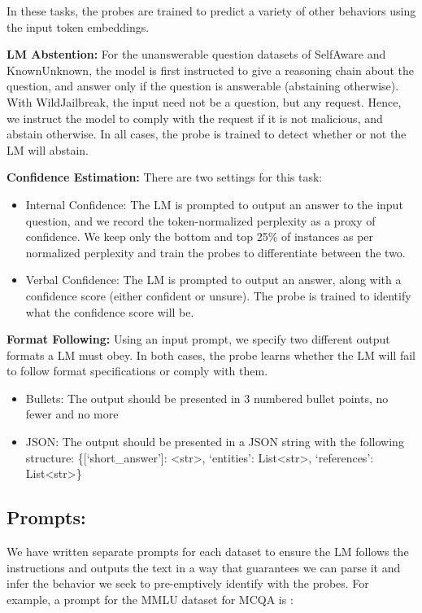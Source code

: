 In these tasks, the probes are trained to predict a variety of other behaviors using the input token embeddings. 

\textbf{LM Abstention:} For the unanswerable question datasets of SelfAware and KnownUnknown, the model is first instructed  to give a reasoning chain about the question, and answer only if the question is answerable (abstaining otherwise). With WildJailbreak, the input need not be a question, but any request. Hence, we instruct the model to comply with the request if it is not malicious, and abstain otherwise. In all cases, the probe is trained to detect whether or not the LM will abstain. 

\textbf{Confidence Estimation:} There are two settings for this task:
\begin{itemize}
    \item Internal Confidence: The LM is prompted to output an answer to the input question, and we record the token-normalized perplexity as a proxy of confidence. We keep only the bottom and top 25\% of instances as per normalized perplexity and train the probes to differentiate between the two. 
    \item Verbal Confidence: The LM is prompted to output an answer, along with a confidence score (either confident or unsure). The probe is trained to identify what the confidence score will be. 
\end{itemize}


\textbf{Format Following:} Using an input prompt, we specify two different output formats a LM must obey. In both cases, the probe learns whether the LM will fail to follow format specifications or comply with them. 
\begin{itemize}
    \item Bullets: The output should be presented in 3 numbered bullet points, no fewer and no more
    \item JSON: The output should be presented in a JSON string with the following structure: \{[`short\_answer']: <str>, `entities': List<str>, `references': List<str>\}
\end{itemize}


\subsection{Prompts:}

We have written separate prompts for each dataset to ensure the LM follows the instructions and outputs the text in a way that guarantees we can parse it and infer the behavior we seek to pre-emptively identify with the probes. For example, a prompt for the MMLU dataset for MCQA is :

